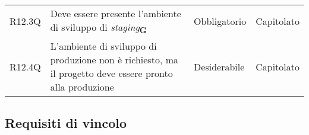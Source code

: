 \begin{center}
\begin{longtable}[!h]{p{50px} p{200px} p{100px} p{50px}}
        R12.3Q                                & Deve essere presente l'ambiente di sviluppo di \textit{staging}\textsubscript{\textbf{G}}                                                                                       & Obbligatorio             & Capitolato                   \\
        R12.4Q                                & L'ambiente di sviluppo di produzione non è richiesto, ma il progetto deve essere pronto alla produzione                                                                         & Desiderabile             & Capitolato                   \\
    \end{longtable}
\end{center}

\newpage
\subsection{Requisiti di vincolo}
